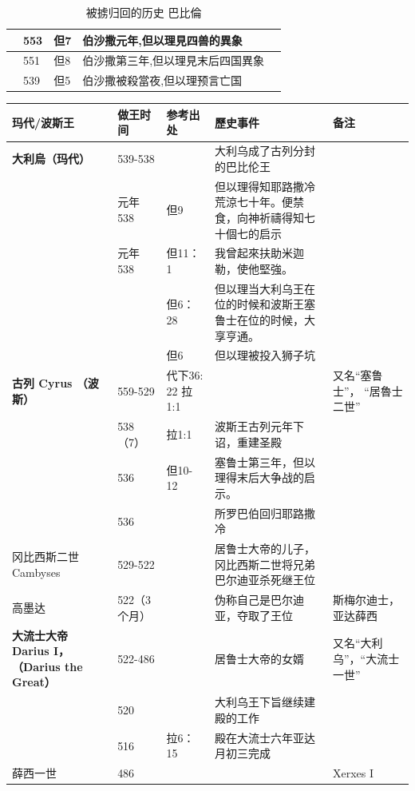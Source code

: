 \begin{table}[!hbp]
\begin{tabular}{|p{}|p{1.5cm}|p{2.5cm}|p{6.2cm}|p{2.5cm}|}
&553&但7& 伯沙撒元年,但以理見四兽的異象& \\\hline	
	&551\cite{伯沙撒}&但8&伯沙撒第三年,但以理見末后四国異象& \\\hline
		&539  &	 	 但5& 伯沙撒被殺當夜,但以理预言亡国& \\\hline	
\end{tabular}
\caption{被掳归回的历史 巴比倫}
\end{table}

 
\begin{table}[!hbp]
\centering 
\begin{tabular}{|p{2.5cm}|p{1.7cm}|p{1.5cm}|p{}|p{2.8cm}|}
\hline
\hline
玛代/波斯王 & 做王时间 &参考出处 & 歷史事件 &备注 \\\hline
\textbf{大利烏（玛代）}&	539-538	&	 	 &大利乌成了古列分封的巴比伦王\cite{伯沙撒}	&   \\\hline
&	元年538	&	但9	 &   但以理得知耶路撒冷荒涼七十年。便禁食，向神祈禱得知七十個七的启示&   \\\hline
&	元年538	&	但11：1	 &   我曾起來扶助米迦勒，使他堅強。&   \\\hline
 &	 	&	但6：28	 &   但以理当大利乌王在位的时候和波斯王塞鲁士在位的时候，大享亨通。	&   \\\hline
&	 	&	但6	 &   但以理被投入狮子坑	&   \\\hline
\textbf{古列 Cyrus    （波斯）}&	559-529	&代下36: 22 拉1:1 && 又名“塞鲁士”， “居魯士二世” \\\hline	
&538（7）\cite{居鲁士}&拉1:1 & 波斯王古列元年下诏，重建圣殿&   \\\hline	
&536&但10-12 & 塞鲁士第三年，但以理得末后大争战的启示。&   \\\hline	
&536& &所罗巴伯回归耶路撒冷&   \\\hline	
冈比西斯二世 Cambyses&	529-522	&  &居鲁士大帝的儿子，冈比西斯二世将兄弟巴尔迪亚杀死继王位  &   \\\hline	
高墨达\cite{高墨达}&	522（3个月）&& 伪称自己是巴尔迪亚，夺取了王位 &斯梅尔迪士，  亚达薛西    \\\hline	
\textbf{大流士大帝 Darius I，（Darius the Great）}& 522-486&  &居鲁士大帝的女婿&  又名“大利乌”，“大流士一世” \\\hline	
& 520&&大利乌王下旨继续建殿的工作& \\\hline
&516&拉6：15&殿在大流士六年亚达月初三完成& \\\hline
薛西一世  & 486 &&&Xerxes I \\\hline

\end{tabular}
\end{table}
